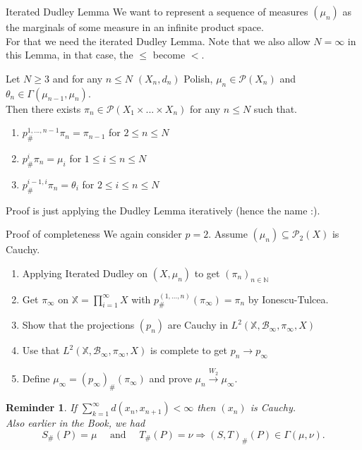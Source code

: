 \documentclass[10pt]{beamer}
\theoremstyle{reminder}
\newtheorem{reminder}{Reminder}
\begin{document}
\begin{frame}{Iterated Dudley Lemma}
    We want to represent a sequence of measures $(\mu_n)$ as the marginals of some measure in an infinite product space. \\ 
    \vspace{0.5cm}
    For that we need the iterated Dudley Lemma. Note that we also allow $N = \infty$ in this Lemma, in that case, the $\leq$ become $<$.
    \begin{lemma}
        Let $N \geq 3$ and for any $n \leq N$ $(X_n,d_n)$ Polish, $\mu_n \in \mathcal{P}(X_n)$ and $\theta_n \in \Gamma(\mu_{n-1},\mu_n)$. \\ 
        Then there exists $\pi_n \in \mathcal{P}(X_1\times ... \times X_n)$ for any $n \leq N$ such that.
        \begin{enumerate}
            \item $p^{1,...,n-1}_{\#} \pi_n = \pi_{n-1}$ for $2 \leq n \leq N$
            \item $p^i_{\#} \pi_n = \mu_i$ for $1 \leq i \leq n \leq N$
            \item $p^{i-1,i}_{\#} \pi_n = \theta_i$ for $2 \leq i\leq n \leq N$
        \end{enumerate}
    \end{lemma}
    Proof is just applying the Dudley Lemma iteratively (hence the name :).
\end{frame}

\begin{frame}{Proof of completeness}
    We again consider $p = 2$. Assume $(\mu_n) \subseteq \mathcal{P}_2(X)$ is Cauchy. 
    \begin{enumerate}
        \item Applying Iterated Dudley on $(X,\mu_n)$ to get $(\pi_n)_{n \in \mathbb{N}}$ 
        \item Get $\pi_\infty$ on $\mathbb{X} = \prod_{i = 1}^{\infty} X$ with $p^{(1,...,n)}_{\#}(\pi_\infty) = \pi_n$ by Ionescu-Tulcea.
        \item Show that the projections $(p_n)$ are Cauchy in $L^2(\mathbb{X}, \mathcal{B}_\infty, \pi_\infty,X)$
        \item Use that $L^2(\mathbb{X}, \mathcal{B}_\infty, \pi_\infty,X)$ is complete to get $p_n \rightarrow p_\infty$
        \item Define $\mu_\infty = (p_\infty)_{\#}(\pi_\infty)$ and prove $\mu_n \xrightarrow{W_2} \mu_\infty.$
    \end{enumerate}
    \begin{reminder}
        If $\sum_{k = 1}^{\infty} d(x_n,x_{n+1}) < \infty$ then $(x_n)$ is Cauchy. \\
        \vspace{0.5cm}
        Also earlier in the Book, we had $$S_{\#}(P) = \mu \quad \text{ and } \quad T_{\#}(P) = \nu \Rightarrow (S,T)_{\#}(P) \in \Gamma(\mu,\nu).$$
    \end{reminder}
\end{frame}
\end{document}
